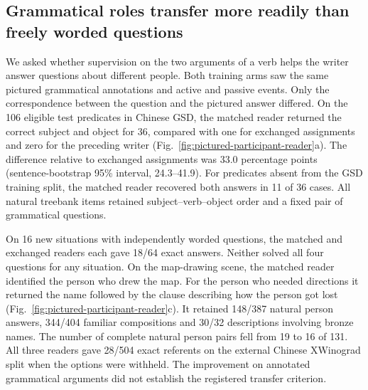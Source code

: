 \subsection*{Grammatical roles transfer more readily than freely worded questions}
We asked whether supervision on the two arguments of a verb helps the writer answer questions about different people. Both training arms saw the same pictured grammatical annotations and active and passive events. Only the correspondence between the question and the pictured answer differed. On the 106 eligible test predicates in Chinese GSD, the matched reader returned the correct subject and object for 36, compared with one for exchanged assignments and zero for the preceding writer (Fig.~\ref{fig:pictured-participant-reader}a). The difference relative to exchanged assignments was 33.0 percentage points (sentence-bootstrap 95\% interval, 24.3--41.9). For predicates absent from the GSD training split, the matched reader recovered both answers in 11 of 36 cases. All natural treebank items retained subject--verb--object order and a fixed pair of grammatical questions.

On 16 new situations with independently worded questions, the matched and exchanged readers each gave 18/64 exact answers. Neither solved all four questions for any situation. On the map-drawing scene, the matched reader identified the person who drew the map. For the person who needed directions it returned the name followed by the clause describing how the person got lost (Fig.~\ref{fig:pictured-participant-reader}c). It retained 148/387 natural person answers, 344/404 familiar compositions and 30/32 descriptions involving bronze names. The number of complete natural person pairs fell from 19 to 16 of 131. All three readers gave 28/504 exact referents on the external Chinese XWinograd split when the options were withheld. The improvement on annotated grammatical arguments did not establish the registered transfer criterion.

